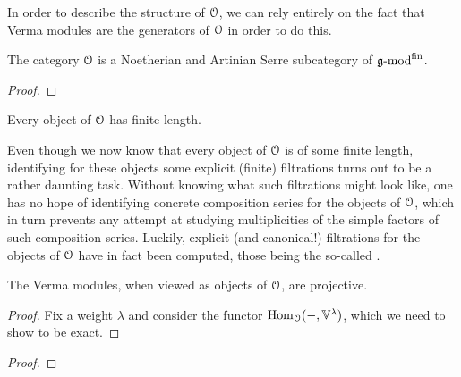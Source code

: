         In order to describe the structure of $\mathcal{O}$, we can rely entirely on the fact that Verma modules are the generators of $\mathcal{O}$ in order to do this.   
        \begin{proposition}
            The category $\mathcal{O}$ is a Noetherian and Artinian Serre subcategory of $\mathfrak{g}\text{-}\mathrm{mod}^{\mathrm{fin}}$.
        \end{proposition}
            \begin{proof}
                
            \end{proof}
        \begin{corollary}
            Every object of $\mathcal{O}$ has finite length.
        \end{corollary}
        \begin{remark}
            Even though we now know that every object of $\mathcal{O}$ is of some finite length, identifying for these objects some explicit (finite) filtrations turns out to be a rather daunting task. Without knowing what such filtrations might look like, one has no hope of identifying concrete composition series for the objects of $\mathcal{O}$, which in turn prevents any attempt at studying multiplicities of the simple factors of such composition series. Luckily, explicit (and canonical!) filtrations for the objects of $\mathcal{O}$ have in fact been computed, those being the so-called .  
        \end{remark}
        \begin{proposition}
            The Verma modules, when viewed as objects of $\mathcal{O}$, are projective. 
        \end{proposition}
            \begin{proof}
                Fix a weight $\lambda$ and consider the functor $\mathrm{Hom}_{\mathcal{O}}(-, \mathbb{V}^{\lambda})$, which we need to show to be exact. 
            \end{proof}
        \begin{proposition} \label{prop: dual_verma_modules}
            
        \end{proposition}
            \begin{proof}
                
            \end{proof}
        \begin{corollary} \label{coro: category_O_has_enough_projectives_and_injectives}
            
        \end{corollary}

